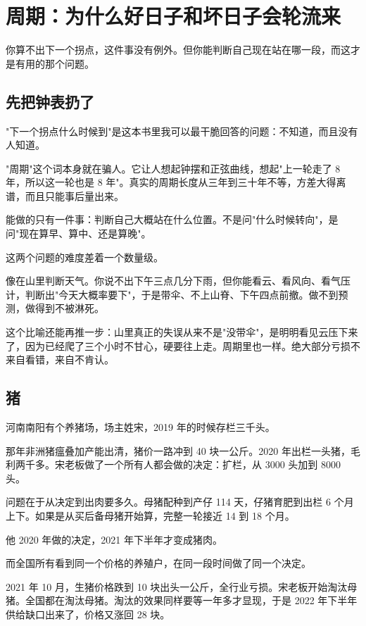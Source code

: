 \chapter{周期：为什么好日子和坏日子会轮流来}

\begin{ledetext}
你算不出下一个拐点，这件事没有例外。但你能判断自己现在站在哪一段，而这才是有用的那个问题。
\end{ledetext}

\section{先把钟表扔了}

"下一个拐点什么时候到"是这本书里我可以最干脆回答的问题：不知道，而且没有人知道。

"周期"这个词本身就在骗人。它让人想起钟摆和正弦曲线，想起"上一轮走了 8 年，所以这一轮也是 8 年"。真实的周期长度从三年到三十年不等，方差大得离谱，而且只能事后量出来。

能做的只有一件事：判断自己大概站在什么位置。不是问"什么时候转向"，是问"现在算早、算中、还是算晚"。

这两个问题的难度差着一个数量级。

像在山里判断天气。你说不出下午三点几分下雨，但你能看云、看风向、看气压计，判断出"今天大概率要下"，于是带伞、不上山脊、下午四点前撤。做不到预测，做得到不被淋死。

这个比喻还能再推一步：山里真正的失误从来不是"没带伞"，是明明看见云压下来了，因为已经爬了三个小时不甘心，硬要往上走。周期里也一样。绝大部分亏损不来自看错，来自不肯认。

\section{猪}

河南南阳有个养猪场，场主姓宋，2019 年的时候存栏三千头。

那年非洲猪瘟叠加产能出清，猪价一路冲到 40 块一公斤。2020 年出栏一头猪，毛利两千多。宋老板做了一个所有人都会做的决定：扩栏，从 3000 头加到 8000 头。

问题在于从决定到出肉要多久。母猪配种到产仔 114 天，仔猪育肥到出栏 6 个月上下。如果是从买后备母猪开始算，完整一轮接近 14 到 18 个月。

他 2020 年做的决定，2021 年下半年才变成猪肉。

而全国所有看到同一个价格的养殖户，在同一段时间做了同一个决定。

2021 年 10 月，生猪价格跌到 10 块出头一公斤，全行业亏损。宋老板开始淘汰母猪。全国都在淘汰母猪。淘汰的效果同样要等一年多才显现，于是 2022 年下半年供给缺口出来了，价格又涨回 28 块。


